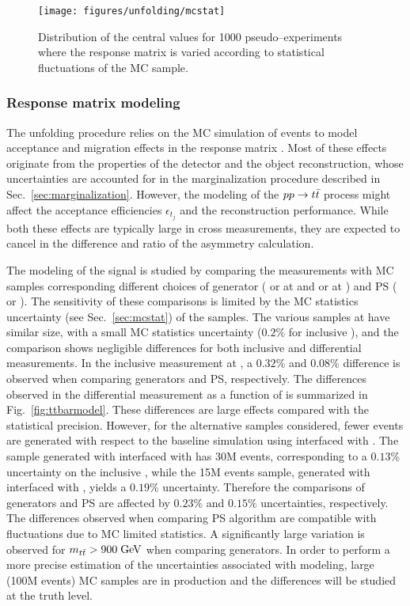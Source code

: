 \begin{figure}[!htb]\centering
  \texttt{[image: figures/unfolding/mcstat]}
  \caption{Distribution of the \ac{} central values for 1000
    pseudo--experiments where the response matrix is varied
    according to statistical fluctuations of the MC sample.}
  \label{fig:mcstat}
\end{figure}

\subsubsection{Response matrix modeling}

The unfolding procedure relies on the MC simulation of \ttbar{} events
to model acceptance and migration effects in the response matrix
\TrasfMatrix{}. Most of these effects originate from the properties of
the detector and the object reconstruction, whose uncertainties are
accounted for in the marginalization procedure described in
Sec.~\ref{sec:marginalization}. However, the modeling of the
$pp\to t\bar{t}{}$ process might affect the acceptance efficiencies
$\epsilon_{t_j}$ and the reconstruction performance. While both these
effects are typically large in cross measurements, they are expected
to cancel in the difference and ratio of the asymmetry calculation.

The modeling of the \ttbar{} signal is studied by comparing the
measurements with MC samples corresponding different choices of generator
(\alpgen{} or \mcatnlo{} at \seventev{} and \powheg{} or \mcatnlo{} at
\eighttev{}) and PS (\pythia{} or \herwig{}).
The sensitivity of these comparisons is limited by the MC statistics
uncertainty (see Sec.~\ref{sec:mcstat}) of the samples. 
The various \ttbar{} samples  at \seventev{} have similar size, with a
small MC statistics uncertainty ($0.2\%$ for inclusive
\ac{}), and the comparison shows negligible differences for both
inclusive and differential measurements. 
In the inclusive measurement at \eighttev{}, a $0.32\%$ and $0.08\%$
difference is observed when comparing generators and PS,
respectively. The differences observed in the differential measurement
as a function of \mtt{} is summarized in Fig.~\ref{fig:ttbarmodel}.
These differences are large effects compared with the statistical
precision. However, for the alternative \ttbar{} samples considered,
fewer events are generated with respect to the baseline simulation
using \powheg{} interfaced with \pythia{}. 
The sample generated with \powheg{} interfaced with \pythia{} has 30M
events, corresponding to a $0.13\%$ uncertainty on the inclusive
\ac{}, while the 15M events sample, generated with \mcatnlo{}
interfaced with \herwig{}, yields a $0.19\%$ uncertainty. Therefore
the comparisons of generators and PS are affected by $0.23\%$ and
$0.15\%$ uncertainties, respectively. The differences observed when
comparing PS algorithm are compatible with fluctuations due to MC limited
statistics. A significantly large variation is observed for
$m_{t\bar{t}}{}>900\; \mathrm{GeV}{}$ when comparing generators.
In order to perform a more precise estimation of the uncertainties
associated with \ttbar{} modeling, large (100M events) MC samples are
in production and the differences will be studied at the truth level.

